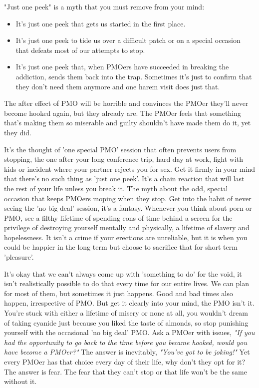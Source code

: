 \documentclass[easypeasy.tex]{subfiles}
\begin{document}
"Just one peek" is a myth that you must remove from your mind:
\begin{itemize}
  \item It's just one peek that gets us started in the first place.
  \item It's just one peek to tide us over a difficult patch or on a special occasion that defeats most of our attempts to stop.
  \item It's just one peek that, when PMOers have succeeded in breaking the addiction, sends them back into the trap. Sometimes it's just to confirm that they don't need them anymore and one harem visit does just that.
\end{itemize}
The after effect of PMO will be horrible and convinces the PMOer they'll never become hooked again, but they already are. The PMOer feels that something that's making them so miserable and guilty shouldn't have made them do it, yet they did.

It's the thought of 'one special PMO' session that often prevents users from stopping, the one after your long conference trip, hard day at work, fight with kids or incident where your partner rejects you for sex. Get it firmly in your mind that there's no such thing as 'just one peek'. It's a chain reaction that will last the rest of your life unless you break it. The myth about the odd, special occasion that keeps PMOers moping when they stop. Get into the habit of never seeing the 'no big deal' session, it's a fantasy. Whenever you think about porn or PMO, see a filthy lifetime of spending eons of time behind a screen for the privilege of destroying yourself mentally and physically, a lifetime of slavery and hopelessness. It isn't a crime if your erections are unreliable, but it is when you could be happier in the long term but choose to sacrifice that for short term 'pleasure'.

It's okay that we can't always come up with 'something to do' for the void, it isn't realistically possible to do that every time for our entire lives. We can plan for most of them, but sometimes it just happens. Good and bad times also happen, irrespective of PMO. But get it clearly into your mind, the PMO isn't it. You're stuck with either a lifetime of misery or none at all, you wouldn't dream of taking cyanide just because you liked the taste of almonds, so stop punishing yourself with the occasional 'no big deal' PMO. Ask a PMOer with issues, \textit{"If you had the opportunity to go back to the time before you became hooked, would you have become a PMOer?"} The answer is inevitably, \textit{"You've got to be joking!"} Yet every PMOer has that choice every day of their life, why don't they opt for it? The answer is fear. The fear that they can't stop or that life won't be the same without it.
\end{document}

